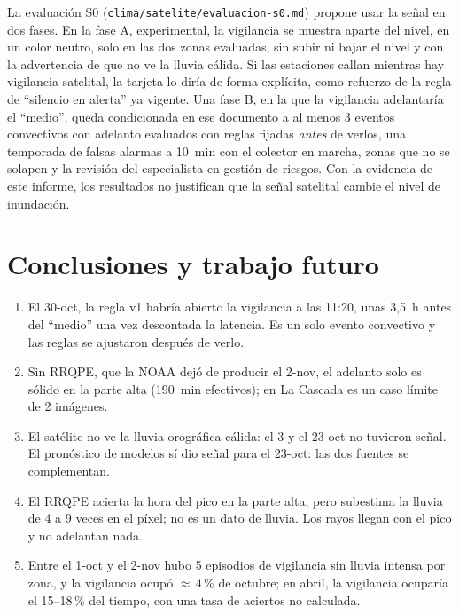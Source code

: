 \documentclass{sosg-informe}
\begin{document}
La evaluación S0 (\texttt{clima/satelite/evaluacion-s0.md}) propone usar la señal en dos fases. En la fase A, experimental, la vigilancia se muestra aparte del nivel, en un color neutro, solo en las dos zonas evaluadas, sin subir ni bajar el nivel y con la advertencia de que no ve la lluvia cálida. Si las estaciones callan mientras hay vigilancia satelital, la tarjeta lo diría de forma explícita, como refuerzo de la regla de \enquote{silencio en alerta} ya vigente. Una fase B, en la que la vigilancia adelantaría el \enquote{medio}, queda condicionada en ese documento a al menos 3 eventos convectivos con adelanto evaluados con reglas fijadas \emph{antes} de verlos, una temporada de falsas alarmas a 10~min con el colector en marcha, zonas que no se solapen y la revisión del especialista en gestión de riesgos. Con la evidencia de este informe, los resultados no justifican que la señal satelital cambie el nivel de inundación.

\section{Conclusiones y trabajo futuro}
\begin{enumerate}
  \item El 30-oct, la regla v1 habría abierto la vigilancia a las 11:20, unas 3,5~h antes del \enquote{medio} una vez descontada la latencia. Es un solo evento convectivo y las reglas se ajustaron después de verlo.
  \item Sin RRQPE, que la NOAA dejó de producir el 2-nov, el adelanto solo es sólido en la parte alta (190~min efectivos); en La Cascada es un caso límite de 2 imágenes.
  \item El satélite no ve la lluvia orográfica cálida: el 3 y el 23-oct no tuvieron señal. El pronóstico de modelos sí dio señal para el 23-oct: las dos fuentes se complementan.
  \item El RRQPE acierta la hora del pico en la parte alta, pero subestima la lluvia de 4 a 9 veces en el píxel; no es un dato de lluvia. Los rayos llegan con el pico y no adelantan nada.
  \item Entre el 1-oct y el 2-nov hubo 5 episodios de vigilancia sin lluvia intensa por zona, y la vigilancia ocupó ${\approx}\,4$\,\% de octubre; en abril, la vigilancia ocuparía el 15--18\,\% del tiempo, con una tasa de aciertos no calculada.
\end{enumerate}
\end{document}
